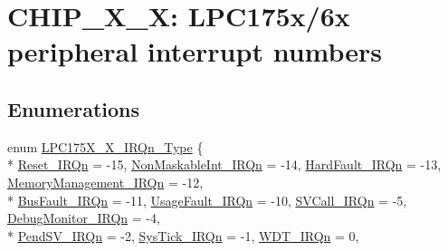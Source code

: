 \hypertarget{group__CMSIS__175X__6X__IRQ}{\section{C\-H\-I\-P\-\_\-X\-\_\-X\-: L\-P\-C175x/6x peripheral interrupt numbers}
\label{group__CMSIS__175X__6X__IRQ}
}
\subsection*{Enumerations}
\begin{DoxyCompactItemize}
\item 
enum \hyperlink{group__CMSIS__175X__6X__IRQ_gaaaeafe7bd8401a46d55e8431b6326116}{L\-P\-C175\-X\-\_\-X\-\_\-\-I\-R\-Qn\-\_\-\-Type} \{ \\*
\hyperlink{group__CMSIS__175X__6X__IRQ_ggaaaeafe7bd8401a46d55e8431b6326116a50ad21f2fd0d54d04b390d5a9145889a}{Reset\-\_\-\-I\-R\-Qn} = -\/15, 
\hyperlink{group__CMSIS__175X__6X__IRQ_ggaaaeafe7bd8401a46d55e8431b6326116ade177d9c70c89e084093024b932a4e30}{Non\-Maskable\-Int\-\_\-\-I\-R\-Qn} = -\/14, 
\hyperlink{group__CMSIS__175X__6X__IRQ_ggaaaeafe7bd8401a46d55e8431b6326116ab1a222a34a32f0ef5ac65e714efc1f85}{Hard\-Fault\-\_\-\-I\-R\-Qn} = -\/13, 
\hyperlink{group__CMSIS__175X__6X__IRQ_ggaaaeafe7bd8401a46d55e8431b6326116a33ff1cf7098de65d61b6354fee6cd5aa}{Memory\-Management\-\_\-\-I\-R\-Qn} = -\/12, 
\\*
\hyperlink{group__CMSIS__175X__6X__IRQ_ggaaaeafe7bd8401a46d55e8431b6326116a8693500eff174f16119e96234fee73af}{Bus\-Fault\-\_\-\-I\-R\-Qn} = -\/11, 
\hyperlink{group__CMSIS__175X__6X__IRQ_ggaaaeafe7bd8401a46d55e8431b6326116a6895237c9443601ac832efa635dd8bbf}{Usage\-Fault\-\_\-\-I\-R\-Qn} = -\/10, 
\hyperlink{group__CMSIS__175X__6X__IRQ_ggaaaeafe7bd8401a46d55e8431b6326116a4ce820b3cc6cf3a796b41aadc0cf1237}{S\-V\-Call\-\_\-\-I\-R\-Qn} = -\/5, 
\hyperlink{group__CMSIS__175X__6X__IRQ_ggaaaeafe7bd8401a46d55e8431b6326116a8e033fcef7aed98a31c60a7de206722c}{Debug\-Monitor\-\_\-\-I\-R\-Qn} = -\/4, 
\\*
\hyperlink{group__CMSIS__175X__6X__IRQ_ggaaaeafe7bd8401a46d55e8431b6326116a03c3cc89984928816d81793fc7bce4a2}{Pend\-S\-V\-\_\-\-I\-R\-Qn} = -\/2, 
\hyperlink{group__CMSIS__175X__6X__IRQ_ggaaaeafe7bd8401a46d55e8431b6326116a6dbff8f8543325f3474cbae2446776e7}{Sys\-Tick\-\_\-\-I\-R\-Qn} = -\/1, 
\hyperlink{group__CMSIS__175X__6X__IRQ_ggaaaeafe7bd8401a46d55e8431b6326116a78573b84a4133ef5812b33ce10dcba12}{W\-D\-T\-\_\-\-I\-R\-Qn} = 0, 

\end{DoxyCompactItemize}
